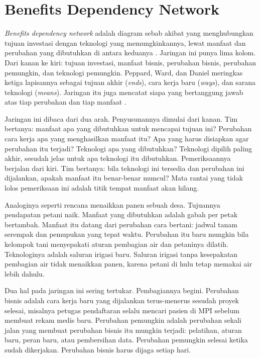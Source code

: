 \section{Benefits Dependency Network}

\textit{Benefits dependency network} adalah diagram sebab akibat yang
menghubungkan tujuan investasi dengan teknologi yang memungkinkannya, lewat
manfaat dan perubahan yang dibutuhkan di antara keduanya \cite{ward2012}.
Jaringan ini punya lima kolom. Dari kanan ke kiri: tujuan investasi, manfaat
bisnis, perubahan bisnis, perubahan pemungkin, dan teknologi pemungkin.
Peppard, Ward, dan Daniel meringkas ketiga lapisannya sebagai tujuan akhir
(\textit{ends}), cara kerja baru (\textit{ways}), dan sarana teknologi
(\textit{means}). Jaringan itu juga mencatat siapa yang bertanggung jawab atas
tiap perubahan dan tiap manfaat \cite{c13-peppard2007}.

Jaringan ini dibaca dari dua arah. Penyusunannya dimulai dari kanan. Tim
bertanya: manfaat apa yang dibutuhkan untuk mencapai tujuan ini? Perubahan
cara kerja apa yang menghasilkan manfaat itu? Apa yang harus disiapkan agar
perubahan itu terjadi? Teknologi apa yang dibutuhkan? Teknologi dipilih paling
akhir, sesudah jelas untuk apa teknologi itu dibutuhkan. Pemeriksaannya
berjalan dari kiri. Tim bertanya: bila teknologi ini tersedia dan perubahan
ini dijalankan, apakah manfaat itu benar-benar muncul? Mata rantai yang tidak
lolos pemeriksaan ini adalah titik tempat manfaat akan hilang.

Analoginya seperti rencana menaikkan panen sebuah desa. Tujuannya pendapatan
petani naik. Manfaat yang dibutuhkan adalah gabah per petak bertambah.
Manfaat itu datang dari perubahan cara bertani: jadwal tanam serempak dan
pemupukan yang tepat waktu. Perubahan itu baru mungkin bila kelompok tani
menyepakati aturan pembagian air dan petaninya dilatih. Teknologinya adalah
saluran irigasi baru. Saluran irigasi tanpa kesepakatan pembagian air tidak
menaikkan panen, karena petani di hulu tetap memakai air lebih dahulu.

Dua hal pada jaringan ini sering tertukar. Pembagiannya begini. Perubahan
bisnis adalah cara kerja baru yang dijalankan terus-menerus sesudah proyek
selesai, misalnya petugas pendaftaran selalu mencari pasien di MPI sebelum
membuat rekam medis baru. Perubahan pemungkin adalah perubahan sekali jalan
yang membuat perubahan bisnis itu mungkin terjadi: pelatihan, aturan baru,
peran baru, atau pembersihan data. Perubahan pemungkin selesai ketika sudah
dikerjakan. Perubahan bisnis harus dijaga setiap hari.

